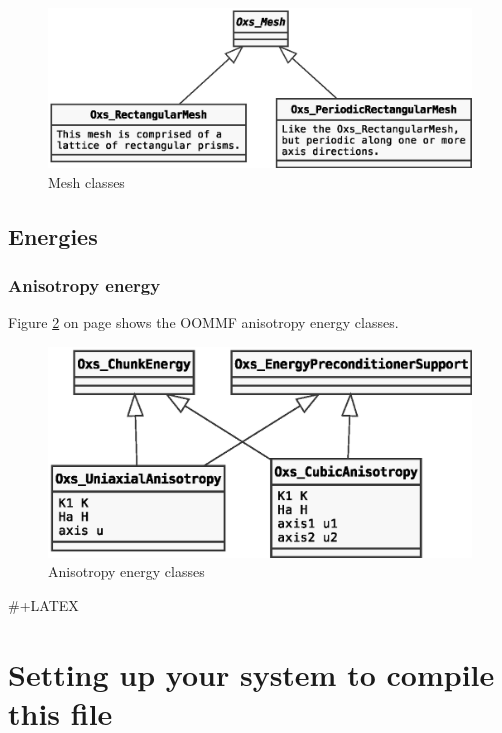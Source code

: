 \documentclass[a4paper,12pt]{article}
\begin{document}
\begin{figure}[htb]
\centering
\includegraphics[width=1\textwidth]{mesh.eps}
\caption{\label{fig:mesh}Mesh classes}
\end{figure}

\subsection{Energies}
\label{sec-1-3}
\subsubsection{Anisotropy energy}
\label{sec-1-3-1}

Figure \ref{fig:anisotropy-energy} on page \pageref{fig:anisotropy-energy} shows the OOMMF anisotropy energy classes.

\begin{figure}[htb]
\centering
\includegraphics[width=1\textwidth]{anisotropy-energy.eps}
\caption{\label{fig:anisotropy-energy}Anisotropy energy classes}
\end{figure}


\#+LATEX \clearpage\newpage

\section{Setting up your system to compile this file}
\label{sec-2}
\end{document}
